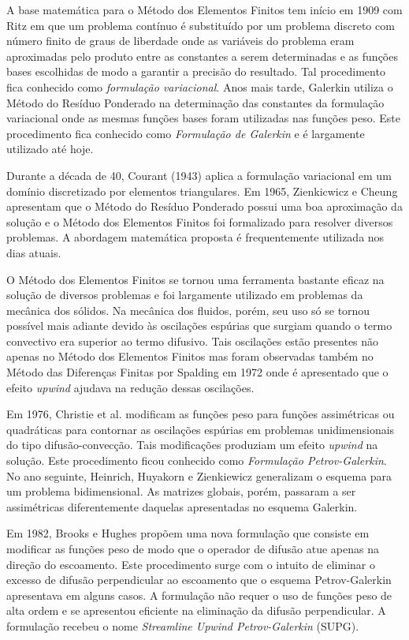 A base matemática para o Método dos Elementos Finitos tem início em 1909 com
Ritz em que um problema contínuo é substituído por um problema discreto
com número finito de graus de liberdade onde as variáveis do problema eram aproximadas
pelo produto entre as constantes a serem determinadas e as funções bases escolhidas de modo 
a garantir a precisão do resultado.
Tal procedimento fica conhecido como \textit{formulação variacional}.
Anos mais tarde, Galerkin utiliza o Método do Resíduo Ponderado na determinação
das constantes da formulação variacional onde as mesmas funções bases foram utilizadas
nas funções peso. Este procedimento fica conhecido como \textit{Formulação de Galerkin}
e é largamente utilizado até hoje.

\medskip
Durante a década de 40, Courant (1943) \cite{courant1943} aplica a formulação variacional em um domínio discretizado
por elementos triangulares. Em 1965, Zienkicwicz e Cheung \cite{zienkiewicz1965} apresentam
que o Método do Resíduo Ponderado possui uma boa aproximação da solução e 
o Método dos Elementos Finitos foi formalizado 
para resolver diversos problemas. A abordagem matemática proposta é frequentemente utilizada nos dias atuais.

\medskip
O Método dos Elementos Finitos se tornou uma ferramenta bastante eficaz na solução de diversos problemas e
foi largamente utilizado em problemas da mecânica dos sólidos. Na mecânica dos fluidos, porém, seu uso só se tornou
possível mais adiante devido às oscilações espúrias que surgiam quando o termo convectivo era superior ao termo
difusivo. Tais oscilações estão presentes não apenas no Método dos Elementos Finitos mas
foram observadas também no Método das Diferenças Finitas por Spalding em 1972 \cite{spalding1972}
onde é apresentado que o efeito \textit{upwind} ajudava na redução dessas oscilações.  

\medskip
Em 1976, Christie et al. \cite{christie1976} modificam as funções peso para funções assimétricas ou quadráticas 
para contornar as oscilações espúrias
em problemas unidimensionais do tipo difusão-convecção. Tais modificações produziam um efeito 
\textit{upwind} na solução. 
Este procedimento ficou conhecido como \textit{Formulação Petrov-Galerkin}. 
No ano seguinte, Heinrich, Huyakorn e Zienkiewicz \cite{heinrich1977} generalizam o esquema para um problema bidimensional.
As matrizes globais, porém, passaram a ser assimétricas diferentemente daquelas apresentadas
no esquema Galerkin.

\medskip
Em 1982, Brooks e Hughes \cite{brooks1982} propõem uma nova formulação que consiste em modificar as 
funções peso de modo que o operador de
difusão atue apenas na direção do escoamento. Este procedimento surge com o intuito de 
eliminar o excesso de difusão perpendicular
ao escoamento que o esquema Petrov-Galerkin apresentava em alguns casos. A formulação 
não requer o uso de funções peso de 
alta ordem e se apresentou eficiente na eliminação da difusão perpendicular. A formulação 
recebeu o nome \textit{Streamline Upwind Petrov-Galerkin} (SUPG).

